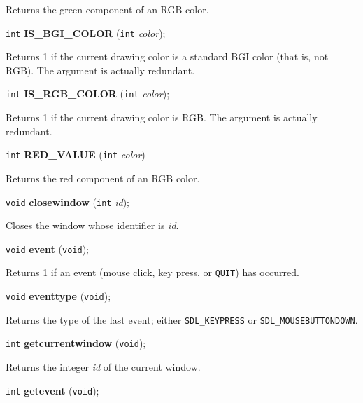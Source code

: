 \documentclass[a4paper,11pt]{article}
\newcommand{\V}{\texttt{void}}      %
\newcommand{\I}{\texttt{int}}       %
\newcommand{\func}[1]{\textbf{#1}}  %
\newcommand{\A}[1]{\emph{#1}}       %
\newcommand{\T}[1]{\texttt{#1}}     %
\newenvironment{bgi}
{ %
  \begin{snugshade}
}
{ %
  \end{snugshade}
}
\begin{document}
Returns the green component of an RGB color.


\begin{bgi}
\I{} \func{IS\_BGI\_COLOR} (\I{} \A{color});
\end{bgi}

Returns 1 if the current drawing color is a standard BGI color (that
is, not RGB). The argument is actually redundant.


\begin{bgi}
\I{} \func{IS\_RGB\_COLOR} (\I{} \A{color});
\end{bgi}

Returns 1 if the current drawing color is RGB. The argument is
actually redundant.


\begin{bgi}
\I{} \func{RED\_VALUE} (\I{} \A{color})
\end{bgi}

Returns the red component of an RGB color.


\begin{bgi}
\V{} \func{closewindow} (\I{} \A{id});
\end{bgi}

Closes the window whose identifier is \A{id}.


\begin{bgi}
\V{} \func{event} (\V{});
\end{bgi}

Returns 1 if an event (mouse click, key press, or \T{QUIT}) has occurred.


\begin{bgi}
\V{} \func{eventtype} (\V{});
\end{bgi}

Returns the type of the last event; either \T{SDL\_KEYPRESS} or
\T{SDL\_MOUSEBUTTONDOWN}.


\begin{bgi}
\I{} \func{getcurrentwindow} (\V{});
\end{bgi}

Returns the integer \A{id} of the current window.


\begin{bgi}
\I{} \func{getevent} (\V{});
\end{bgi}
\end{document}
